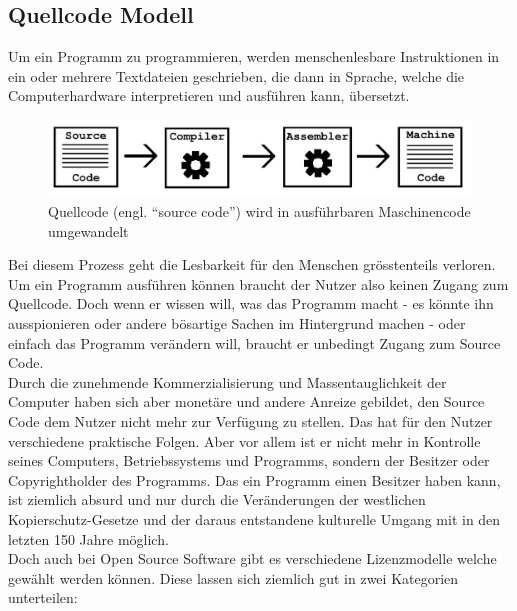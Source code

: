 \documentclass[a4paper,11pt]{article}
\begin{document}
\subsection{Quellcode Modell}
Um ein Programm zu programmieren, werden menschenlesbare Instruktionen in ein oder mehrere Textdateien geschrieben,
die dann in Sprache, welche die Computerhardware interpretieren und ausführen kann, übersetzt.

\begin{figure}[H]
    \centering
    \includegraphics[width=.8\textwidth]{media/Source2Executable.jpg}
    \caption{Quellcode (engl. ``source code'') wird in ausführbaren Maschinencode umgewandelt \cite{stallman2002}} 
\end{figure}

Bei diesem Prozess geht die Lesbarkeit für den Menschen grösstenteils verloren. Um ein Programm ausführen können braucht der Nutzer also keinen Zugang zum Quellcode. Doch wenn er wissen will, was das Programm macht - es könnte ihn ausspionieren oder andere bösartige Sachen im Hintergrund machen - oder einfach das Programm verändern will, braucht er unbedingt Zugang zum Source Code.\\

Durch die zunehmende Kommerzialisierung und Massentauglichkeit der Computer haben sich aber monetäre und andere Anreize gebildet, den Source Code dem Nutzer nicht mehr zur Verfügung zu stellen. Das hat für den Nutzer verschiedene praktische Folgen. Aber vor allem ist er nicht mehr in Kontrolle seines Computers, Betriebssystems und Programms, sondern der Besitzer oder Copyrightholder des Programms. Das ein Programm einen Besitzer haben kann, ist ziemlich absurd und nur durch die Veränderungen der westlichen Kopierschutz-Gesetze und der daraus entstandene kulturelle Umgang mit  in den letzten 150 Jahre möglich.\\

Doch auch bei Open Source Software gibt es verschiedene Lizenzmodelle welche gewählt werden können. Diese lassen sich ziemlich gut in zwei Kategorien unterteilen:\\
\end{document}
